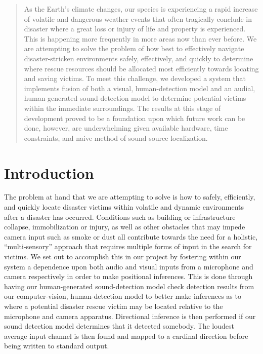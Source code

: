 \documentclass{article}
\author{
  Duggan, WIll\\
  \texttt{dwduggan@mail.sc.edu}
  \and
  Lewis, Cole\\
  \texttt{lewiscg@mail.sc.edu}
  \and
  Mallari, Daniella\\
  \texttt{dmallari@mail.sc.edu}
}
\title{}
\begin{document}

\begin{abstract}
As the Earth’s climate changes, our species is experiencing a rapid increase of volatile and dangerous weather events that often tragically conclude in disaster where a great loss or injury of life and property is experienced. This is happening more frequently in more areas now than ever before. We are attempting to solve the problem of how best to effectively navigate disaster-stricken environments safely, effectively, and quickly to determine where rescue resources should be allocated most efficiently towards locating and saving victims. To meet this challenge, we developed a system that implements fusion of both a visual, human-detection model and an audial, human-generated sound-detection model to determine potential victims within the immediate surroundings. The results at this stage of development proved to be a foundation upon which future work can be done, however, are underwhelming given available hardware, time constraints, and naive method of sound source localization.

\end{abstract}

\section{Introduction}
The problem at hand that we are attempting to solve is how to safely, efficiently, and quickly locate disaster victims within volatile and dynamic environments after a disaster has occurred. Conditions such as building or infrastructure collapse, immobilization or injury, as well as other obstacles that may impede camera input such as smoke or dust all contribute towards the need for a holistic, “multi-sensory” approach that requires multiple forms of input in the search for victims. We set out to accomplish this in our project by fostering within our system a dependence upon both audio and visual inputs from a microphone and camera respectively in order to make positional inferences. This is done through having our human-generated sound-detection model check detection results from our computer-vision, human-detection model to better make inferences as to where a potential disaster rescue victim may be located relative to the microphone and camera apparatus. Directional inference is then performed if our sound detection model determines that it detected somebody. The loudest average input channel is then found and mapped to a cardinal direction before being written to standard output. 
\end{document}
